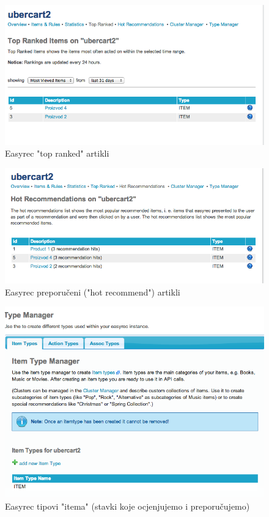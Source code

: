 \documentclass[times, utf8, seminar]{fit}
\begin{document}
{{\begin{figure}[H]
\centering
\includegraphics[width=12cm]{img/easyrec_4_top_ranked.png}
\caption{Easyrec "top ranked" artikli}
\end{figure}

\begin{figure}[H]
\centering
\includegraphics[width=12cm]{img/easyrec_5_hot_recommend.png}
\caption{Easyrec preporučeni ("hot recommend") artikli}
\end{figure}

\begin{figure}[H]
\centering
\includegraphics[width=12cm]{img/easyrec_6_item_types.png}
\caption{Easyrec tipovi "itema" (stavki koje ocjenjujemo i preporučujemo) }
\end{figure}

}}
\end{document}
